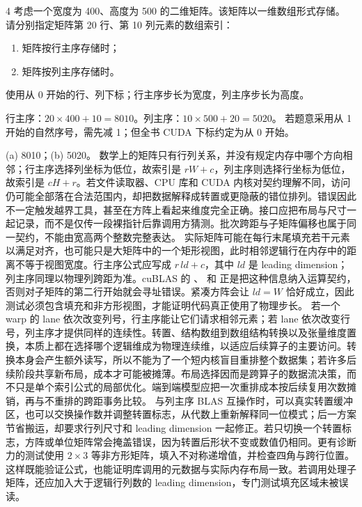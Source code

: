 \begin{solutionexercise}{4}
\problemheading 考虑一个宽度为 400、高度为 500 的二维矩阵。该矩阵以一维数组形式存储。
请分别指定矩阵第 20 行、第 10 列元素的数组索引：
\begin{enumerate}[label=\alph*.,leftmargin=2.2em]
  \item 矩阵按行主序存储时；
  \item 矩阵按列主序存储时。
\end{enumerate}

\approachheading 使用从 0 开始的行、列下标；行主序步长为宽度，列主序步长为高度。

\answerheading 行主序：$20\times400+10=8010$。列主序：$10\times500+20=5020$。
若题意采用从 1 开始的自然序号，需先减 1；但全书 CUDA 下标约定为从 0 开始。

\conclusionheading (a) 8010；(b) 5020。
\discussionheading
{}
数学上的矩阵只有行列关系，并没有规定内存中哪个方向相邻；行主序选择列坐标为低位，故索引是 $rW+c$，列主序则选择行坐标为低位，故索引是 $cH+r$。若文件读取器、CPU 库和 CUDA 内核对契约理解不同，访问仍可能全部落在合法范围内，却把数据解释成转置或更隐蔽的错位排列。错误因此不一定触发越界工具，甚至在方阵上看起来维度完全正确。接口应把布局与尺寸一起记录，而不是仅传一段裸指针后靠调用方猜测。批次跨距与子矩阵偏移也属于同一契约，不能由宽高两个整数完整表达。
实际矩阵可能在每行末尾填充若干元素以满足对齐，也可能只是大矩阵中的一个矩形视图，此时相邻逻辑行在内存中的距离不等于视图宽度。行主序公式应写成 $r\,ld+c$，其中 $ld$ 是 leading dimension；列主序同理以物理列跨距为准。cuBLAS 的 、 和  正是把这种信息纳入运算契约，否则对子矩阵的第二行开始就会寻址错误。紧凑方阵会让 $ld=W$ 恰好成立，因此测试必须包含填充和非方形视图，才能证明代码真正使用了物理步长。
若一个 warp 的 lane 依次改变列号，行主序能让它们请求相邻元素；若 lane 依次改变行号，列主序才提供同样的连续性。转置、结构数组到数组结构转换以及张量维度置换，本质上都在选择哪个逻辑维成为物理连续维，以适应后续算子的主要访问。转换本身会产生额外读写，所以不能为了一个短内核盲目重排整个数据集；若许多后续阶段共享新布局，成本才可能被摊薄。布局选择因而是跨算子的数据流决策，而不只是单个索引公式的局部优化。端到端模型应把一次重排成本按后续复用次数摊销，再与不重排的跨距事务比较。
与列主序 BLAS 互操作时，可以真实转置缓冲区，也可以交换操作数并调整转置标志，从代数上重新解释同一位模式；后一方案节省搬运，却要求行列尺寸和 leading dimension 一起修正。若只切换一个转置标志，方阵或单位矩阵常会掩盖错误，因为转置后形状不变或数值仍相同。更有诊断力的测试使用 $2\times3$ 等非方形矩阵，填入不对称递增值，并检查四角与跨行位置。这样既能验证公式，也能证明库调用的元数据与实际内存布局一致。若调用处理子矩阵，还应加入大于逻辑行列数的 leading dimension，专门测试填充区域未被误读。

\end{solutionexercise}
